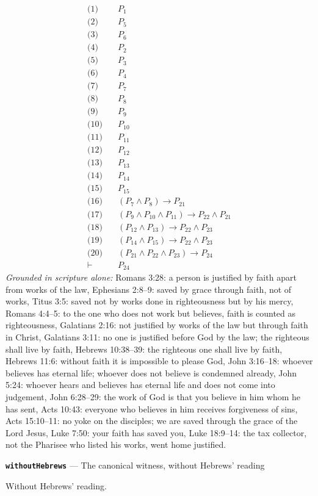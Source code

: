 \documentclass[11pt]{article}
\begin{document}
\begin{align*}
  \text{(1)} \quad & P_{1} \\
  \text{(2)} \quad & P_{5} \\
  \text{(3)} \quad & P_{6} \\
  \text{(4)} \quad & P_{2} \\
  \text{(5)} \quad & P_{3} \\
  \text{(6)} \quad & P_{4} \\
  \text{(7)} \quad & P_{7} \\
  \text{(8)} \quad & P_{8} \\
  \text{(9)} \quad & P_{9} \\
  \text{(10)} \quad & P_{10} \\
  \text{(11)} \quad & P_{11} \\
  \text{(12)} \quad & P_{12} \\
  \text{(13)} \quad & P_{13} \\
  \text{(14)} \quad & P_{14} \\
  \text{(15)} \quad & P_{15} \\
  \text{(16)} \quad & (P_{7} \land P_{8}) \rightarrow P_{21} \\
  \text{(17)} \quad & (P_{9} \land P_{10} \land P_{11}) \rightarrow P_{22} \land P_{21} \\
  \text{(18)} \quad & (P_{12} \land P_{13}) \rightarrow P_{22} \land P_{23} \\
  \text{(19)} \quad & (P_{14} \land P_{15}) \rightarrow P_{22} \land P_{23} \\
  \text{(20)} \quad & (P_{21} \land P_{22} \land P_{23}) \rightarrow P_{24} \\
  \vdash \quad & P_{24}
\end{align*}
\emph{Grounded in scripture alone:} Romans 3:28: a person is justified by faith apart from works of the law, Ephesians 2:8–9: saved by grace through faith, not of works, Titus 3:5: saved not by works done in righteousness but by his mercy, Romans 4:4–5: to the one who does not work but believes, faith is counted as righteousness, Galatians 2:16: not justified by works of the law but through faith in Christ, Galatians 3:11: no one is justified before God by the law; the righteous shall live by faith, Hebrews 10:38–39: the righteous one shall live by faith, Hebrews 11:6: without faith it is impossible to please God, John 3:16–18: whoever believes has eternal life; whoever does not believe is condemned already, John 5:24: whoever hears and believes has eternal life and does not come into judgement, John 6:28–29: the work of God is that you believe in him whom he has sent, Acts 10:43: everyone who believes in him receives forgiveness of sins, Acts 15:10–11: no yoke on the disciples; we are saved through the grace of the Lord Jesus, Luke 7:50: your faith has saved you, Luke 18:9–14: the tax collector, not the Pharisee who listed his works, went home justified.
\par\medskip\noindent\textbf{\texttt{without\allowbreak{}Hebrews}} --- The canonical witness, without Hebrews' reading\par\nobreak\noindent
Without Hebrews' reading.
\end{document}
